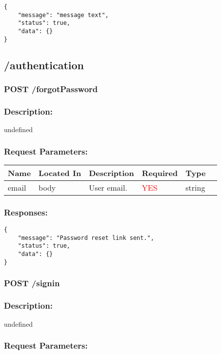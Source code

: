 \documentclass{article}
\begin{document}
\begin{lstlisting}[frame=single, title=\textbf{200}] 
{
    "message": "message text",
    "status": true,
    "data": {}
}
\end{lstlisting}
  
\subsection*{/authentication}
\subsubsection*{\textcolor{NavyBlue}{POST} /forgotPassword}
\subsubsection{Description:} 
undefined
 \subsubsection{Request Parameters:} 
 
\begin{tabular}{ | l | l | l | l | l | p{5cm} |} 
 \hline 
\textbf{Name} & \textbf{Located In} & \textbf{Description} & \textbf{Required} & \textbf{Type}\\ \hline 
email & body & User email. & \textcolor{red}{YES} & string\\ \hline 
\end{tabular} 
 
\subsubsection{Responses:}
  
\begin{lstlisting}[frame=single, title=\textbf{200}] 
{
    "message": "Password reset link sent.",
    "status": true,
    "data": {}
}
\end{lstlisting}
  
\subsubsection*{\textcolor{NavyBlue}{POST} /signin}
\subsubsection{Description:} 
undefined
 \subsubsection{Request Parameters:} 
 
\end{document}
